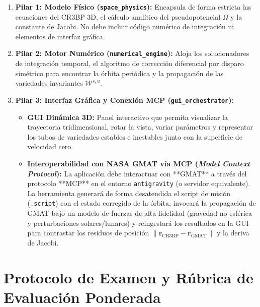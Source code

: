 \documentclass[11pt, a4paper]{article}
\begin{document}
	\begin{enumerate}[leftmargin=*]
		\item \textbf{Pilar 1: Modelo Físico (\texttt{space\_physics}):} Encapsula de forma estricta las ecuaciones del CR3BP 3D, el cálculo analítico del pseudopotencial $\Omega$ y la constante de Jacobi. No debe incluir código numérico de integración ni elementos de interfaz gráfica.
		\item \textbf{Pilar 2: Motor Numérico (\texttt{numerical\_engine}):} Aloja los solucionadores de integración temporal, el algoritmo de corrección diferencial por disparo simétrico para encontrar la órbita periódica y la propagación de las variedades invariantes $\mathcal{W}^{s,u}$.
		\item \textbf{Pilar 3: Interfaz Gráfica y Conexión MCP (\texttt{gui\_orchestrator}):}
		\begin{itemize}
			\item \textbf{GUI Dinámica 3D:} Panel interactivo que permita visualizar la trayectoria tridimensional, rotar la vista, variar parámetros y representar los tubos de variedades estables e inestables junto con la superficie de velocidad cero.
			\item \textbf{Interoperabilidad con NASA GMAT vía MCP (\textit{Model Context Protocol}):} La aplicación debe interactuar con **GMAT** a través del protocolo **MCP** en el entorno \texttt{antigravity} (o servidor equivalente). La herramienta generará de forma desatendida el script de misión (\texttt{.script}) con el estado corregido de la órbita, invocará la propagación de GMAT bajo un modelo de fuerzas de alta fidelidad (gravedad no esférica y perturbaciones solares/lunares) y reingestará los resultados en la GUI para contrastar los residuos de posición $\|\mathbf{r}_{\text{CR3BP}} - \mathbf{r}_{\text{GMAT}}\|$ y la deriva de Jacobi.
		\end{itemize}
	\end{enumerate}
	
	\section{Protocolo de Examen y Rúbrica de Evaluación Ponderada}
	
\end{document}
